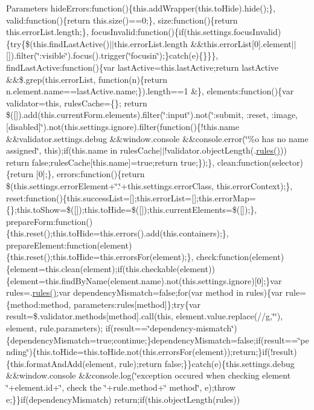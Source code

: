 {\begin{DoxyParams}{Parameters}
hide\+Errors\+:function()\{this.\+add\+Wrapper(this.\+to\+Hide).hide();\}, valid\+:function()\{return this.\+size()==0;\}, size\+:function()\{return this.\+error\+List.\+length;\}, focus\+Invalid\+:function()\{if(this.\+settings.\+focus\+Invalid)\{try\{\$(this.\+find\+Last\+Active()$\vert$$\vert$this.error\+List.\+length \&\&this.\+error\+List\mbox{[}0\mbox{]}.element$\vert$$\vert$\mbox{[}\mbox{]}).filter(\char`\"{}\+:visible\char`\"{}).focus().trigger(\char`\"{}focusin\char`\"{});\}catch(e)\{\}\}\}, find\+Last\+Active\+:function()\{var last\+Active=this.\+last\+Active;return last\+Active \&\&\$.grep(this.\+error\+List, function(n)\{return n.\+element.\+name==last\+Active.\+name;\}).length==1 \&\}, elements\+:function()\{var validator=this, rules\+Cache=\{\}; return \$(\mbox{[}\mbox{]}).add(this.\+current\+Form.\+elements).filter(\char`\"{}\+:input\char`\"{}).not(\char`\"{}\+:submit, \+:reset, \+:image, \mbox{[}disabled\mbox{]}\char`\"{}).not(this.\+settings.\+ignore).filter(function()\{!this.name \&\&validator.\+settings.\+debug \&\&window.\+console \&\&console.\+error(\char`\"{}\%o has no name assigned\char`\"{}, this);if(this.\+name in rules\+Cache$\vert$$\vert$!validator.object\+Length(.\hyperlink{obj_2_release_2_package_2_package_tmp_2_scripts_2respond_8js_ada87c2e257bc5ff6e77cdbc23ed986a3}{rules()})) return false;rules\+Cache\mbox{[}this.\+name\mbox{]}=true;return true;\});\}, clean\+:function(selector)\{return \mbox{[}0\mbox{]};\}, errors\+:function()\{return \$(this.\+settings.\+error\+Element+\char`\"{}.\char`\"{}+this.settings.\+error\+Class, this.\+error\+Context);\}, reset\+:function()\{this.\+success\+List=\mbox{[}\mbox{]};this.\+error\+List=\mbox{[}\mbox{]};this.\+error\+Map=\{\};this.\+to\+Show=\$(\mbox{[}\mbox{]});this.\+to\+Hide=\$(\mbox{[}\mbox{]});this.\+current\+Elements=\$(\mbox{[}\mbox{]});\}, prepare\+Form\+:function()\{this.\+reset();this.\+to\+Hide=this.\+errors().add(this.\+containers);\}, prepare\+Element\+:function(element)\{this.\+reset();this.\+to\+Hide=this.\+errors\+For(element);\}, check\+:function(element)\{element=this.\+clean(element);if(this.\+checkable(element))\{element=this.\+find\+By\+Name(element.\+name).not(this.\+settings.\+ignore)\mbox{[}0\mbox{]};\}var rules=.\hyperlink{obj_2_release_2_package_2_package_tmp_2_scripts_2respond_8js_ada87c2e257bc5ff6e77cdbc23ed986a3}{rules()};var dependency\+Mismatch=false;for(var method in rules)\{var rule=\{method\+:method, parameters\+:rules\mbox{[}method\mbox{]}\};try\{var result=\$.validator.\+methods\mbox{[}method\mbox{]}.call(this, element.\+value.\+replace(//g,\char`\"{}\char`\"{}), element, rule.\+parameters); if(result==\char`\"{}dependency-\/mismatch\char`\"{})\{dependency\+Mismatch=true;continue;\}dependency\+Mismatch=false;if(result==\char`\"{}pending\char`\"{})\{this.\+to\+Hide=this.\+to\+Hide.\+not(this.\+errors\+For(element));return;\}if(!result)\{this.\+format\+And\+Add(element, rule);return false;\}\}catch(e)\{this.\+settings.\+debug \&\&window.\+console \&\&console.\+log(\char`\"{}exception occured when checking element \char`\"{}+element.id+\char`\"{}, check the \textquotesingle{}\char`\"{}+rule.method+\char`\"{}\textquotesingle{} method\char`\"{}, e);throw e;\}\}if(dependency\+Mismatch) return;if(this.\+object\+Length(rules)) 
\end{DoxyParams}}
